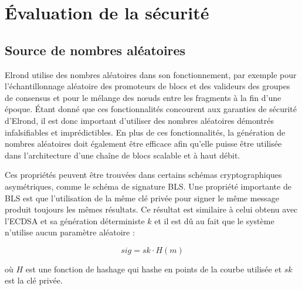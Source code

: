 \documentclass[journal]{IEEEtran}
\begin{document}
\section{Évaluation de la sécurité}

\subsection{Source de nombres aléatoires}
Elrond utilise des nombres aléatoires dans son fonctionnement, par exemple pour l'échantillonnage aléatoire des promoteurs de blocs et des valideurs des groupes de consensus et pour le mélange des nœuds entre les fragments à la fin d'une époque. Étant donné que ces fonctionnalités concourent  aux garanties de sécurité d'Elrond, il est donc important d'utiliser des nombres aléatoires démontrés infalsifiables et imprédictibles. En plus de ces fonctionnalités, la génération de nombres aléatoires doit également être efficace afin qu'elle puisse être utilisée dans  l'architecture d'une chaîne  de blocs scalable et à haut débit. 

Ces propriétés peuvent être trouvées dans certains schémas cryptographiques asymétriques, comme le schéma de signature BLS. Une propriété importante de BLS est que l'utilisation de la même clé privée pour signer le même message produit toujours les mêmes résultats.  Ce résultat est similaire à celui obtenu avec l'ECDSA et sa génération déterministe $k$ et il est dû au fait que le système n'utilise aucun paramètre aléatoire : 


\begin{equation}
\label{8}
   sig = sk \cdot H(m)
\end{equation}

où $H$ est une fonction de hashage qui hashe en points de la courbe utilisée et $sk$ est la clé privée.
\end{document}
